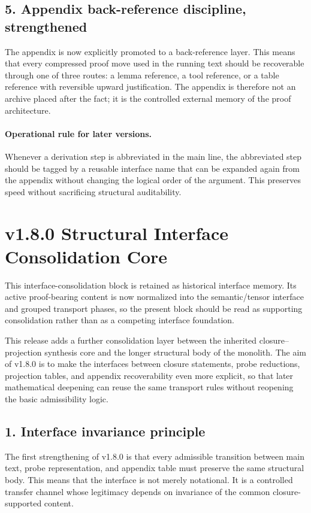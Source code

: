\subsection*{5. Appendix back-reference discipline, strengthened}
The appendix is now explicitly promoted to a back-reference layer. This means
that every compressed proof move used in the running text should be recoverable
through one of three routes: a lemma reference, a tool reference, or a table
reference with reversible upward justification. The appendix is therefore not an
archive placed after the fact; it is the controlled external memory of the proof
architecture.

\paragraph{Operational rule for later versions.}
Whenever a derivation step is abbreviated in the main line, the abbreviated step
should be tagged by a reusable interface name that can be expanded again from
the appendix without changing the logical order of the argument. This preserves
speed without sacrificing structural auditability.


\section*{v1.8.0 Structural Interface Consolidation Core}

\begin{remark}
\label{rem:normalization-note-v180}
This interface-consolidation block is retained as historical interface memory. Its active proof-bearing content is now normalized into the semantic/tensor interface and grouped transport phases, so the present block should be read as supporting consolidation rather than as a competing interface foundation.
\end{remark}

This release adds a further consolidation layer between the inherited closure--projection
synthesis core and the longer structural body of the monolith. The aim of
v1.8.0 is to make the interfaces between closure statements, probe reductions,
projection tables, and appendix recoverability even more explicit, so that later
mathematical deepening can reuse the same transport rules without reopening the
basic admissibility logic.

\subsection*{1. Interface invariance principle}
The first strengthening of v1.8.0 is that every admissible transition between
main text, probe representation, and appendix table must preserve the same
structural body. This means that the interface is not merely notational. It is a
controlled transfer channel whose legitimacy depends on invariance of the common
closure-supported content.

